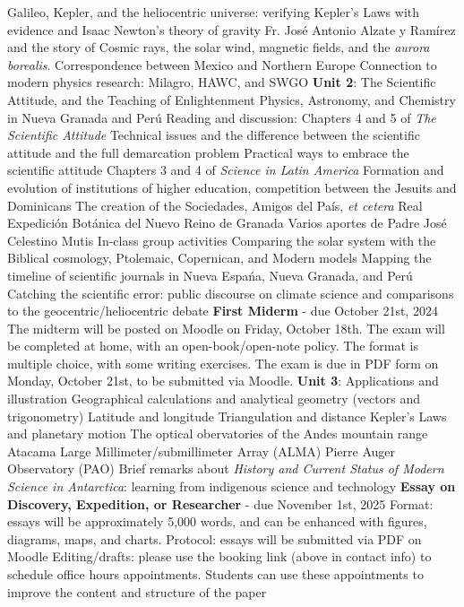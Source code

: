 \documentclass[10pt]{article}
\begin{document}
\begin{outline}[enumerate]
\3 Galileo, Kepler, and the heliocentric universe: verifying Kepler's Laws with evidence and Isaac Newton's theory of gravity
\3 Fr. Jos\'{e} Antonio Alzate y Ramírez and the story of Cosmic rays, the solar wind, magnetic fields, and the \textit{aurora borealis}.  Correspondence between Mexico and Northern Europe
\3 Connection to modern physics research: Milagro, HAWC, and SWGO
\1 \textbf{Unit 2}: The Scientific Attitude, and the Teaching of Enlightenment Physics, Astronomy, and Chemistry in Nueva Granada and Per\'{u}
\2 Reading and discussion:
\3 Chapters 4 and 5 of \textit{The Scientific Attitude}
\4 Technical issues and the difference between the scientific attitude and the full demarcation problem
\4 Practical ways to embrace the scientific attitude
\3 Chapters 3 and 4 of \textit{Science in Latin America}
\4 Formation and evolution of institutions of higher education, competition between the Jesuits and Dominicans
\4 The creation of the Sociedades, Amigos del Pa\'{i}s, \textit{et cetera}
\4 Real Expedici\'{o}n Bot\'{a}nica del Nuevo Reino de Granada
\4 Varios aportes de Padre Jos\'{e} Celestino Mutis
\2 In-class group activities
\3 Comparing the solar system with the Biblical cosmology, Ptolemaic, Copernican, and Modern models
\3 Mapping the timeline of scientific journals in Nueva Espa\'{n}a, Nueva Granada, and Per\'{u}
\3 Catching the scientific error: public discourse on climate science and comparisons to the geocentric/heliocentric debate
\1 \textbf{First Miderm} - due October 21st, 2024
\2 The midterm will be posted on Moodle on Friday, October 18th.
\2 The exam will be completed at home, with an open-book/open-note policy.  The format is multiple choice, with some writing exercises.
\2 The exam is due in PDF form on Monday, October 21st, to be submitted via Moodle.
\1 \textbf{Unit 3}: Applications and illustration
\2 Geographical calculations and analytical geometry (vectors and trigonometry)
\3 Latitude and longitude
\3 Triangulation and distance
\3 Kepler's Laws and planetary motion
\3 The optical obervatories of the Andes mountain range
\2 Atacama Large Millimeter/submillimeter Array (ALMA)
\2 Pierre Auger Observatory (PAO)
\2 Brief remarks about \textit{History and Current Status of Modern Science in Antarctica}: learning from indigenous science and technology
\1 \textbf{Essay on Discovery, Expedition, or Researcher} - due November 1st, 2025
\2 Format: essays will be approximately 5,000 words, and can be enhanced with figures, diagrams, maps, and charts.
\2 Protocol: essays will be submitted via PDF on Moodle
\2 Editing/drafts: please use the booking link (above in contact info) to schedule office hours appointments.  Students can use these appointments to improve the content and structure of the paper

\end{outline}
\end{document}
